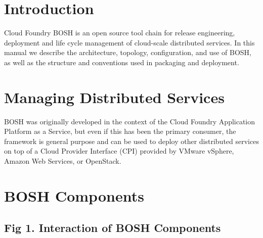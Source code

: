
\def\mytitle{Cloud Foundry Technical Overview}
\def\myauthor{VMware 2012 - Cloud Foundry}
\def\latexmode{memoir}

\chapter{Introduction}
\label{introduction}

Cloud Foundry BOSH is an open source tool chain for release engineering, deployment and life cycle management of cloud-scale distributed services. In this manual we describe the architecture, topology, configuration, and use of BOSH, as well as the structure and conventions used in packaging and deployment.

\chapter{Managing Distributed Services}
\label{managingdistributedservices}

BOSH was originally developed in the context of the Cloud Foundry Application Platform as a Service, but even if this has been the primary consumer, the framework is general purpose and can be used to deploy other distributed services on top of a Cloud Provider Interface (CPI) provided by VMware vSphere, Amazon Web Services, or OpenStack. 

\chapter{BOSH Components}
\label{boshcomponents}

\section{Fig 1. Interaction of BOSH Components}
\label{fig1.interactionofboshcomponents}

